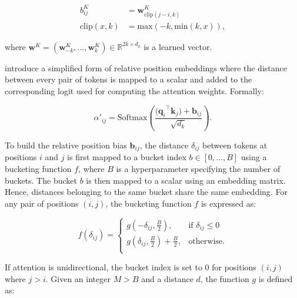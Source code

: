 \begin{equation}
\begin{aligned}
    b^K_{ij} &= \bm{w}^K_{\text{clip}(j-i, k)} \\
    \text{clip}(x, k) &= \text{max}(-k, \text{min}(k, x)),
\end{aligned}
\end{equation}

\noindent where $\bm{w}^K = (\bm{w}^K_{-k}, \ldots, \bm{w}^K_{k}) \in \mathbb{R}^{2k \times d_a}$ is a learned vector.

\citet{raffel2020exploring} introduce a simplified form of relative position embeddings where the distance between every pair of tokens is mapped to a scalar and added to the corresponding logit used for computing the attention weights. Formally:

\begin{equation}
    \alpha'_{ij} = \mathrm{Softmax}\left(\frac{{(\bm{q}_i}^{\top} \bm{k}_j) + \bm{b}_{ij}}{\sqrt{d_k}}\right).
\end{equation}

\noindent To build the relative position bias $\bm{b}_{ij}$, the distance $\delta_{ij}$ between tokens at positions $i$ and $j$ is first mapped to a bucket index $b \in [0, \ldots, B]$ using a bucketing function $f$, where $B$ is a hyperparameter specifying the number of buckets. The bucket $b$ is then mapped to a scalar using an embedding matrix. Hence, distances belonging to the same bucket share the same embedding. For any pair of positions $(i, j)$, the bucketing function $f$ is expressed as:

\begin{equation}
    f(\delta_{ij}) = 
    \begin{cases}
        g\left(-\delta_{ij}, \frac{B}{2}\right), & \text{if } \delta_{ij} \leq 0 \\
        g\left(\delta_{ij}, \frac{B}{2}\right) + \frac{B}{2}, & \text{otherwise.} \\
    \end{cases}
\end{equation}

\noindent If attention is unidirectional, the bucket index is set to $0$ for positions $(i, j)$ where $j > i$. Given an integer $M > B$ and a distance $d$, the function $g$ is defined as:

